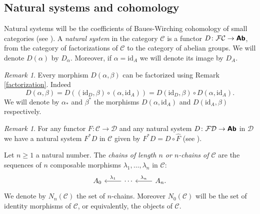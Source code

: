 \documentclass[12pt,reqno]{amsart}
\theoremstyle{definition}
\newtheorem{defi}[teo]{Definition}
\theoremstyle{remark}
\newtheorem{rem}[teo]{Remark}
\numberwithin{figure}{section}%
\newcommand{\CC}{\mathcal{C}}
\newcommand{\Dc}{\mathcal{D}}
\newcommand{\F}{\mathcal{F}}
\newcommand{\id}{\mathrm{id}}
\newcommand{\Ab}{\textbf{\textsf{Ab}}}
\begin{document}

\subsection{Natural systems and cohomology}\label{subsec:natural_systems_cohomology}
    Natural systems will be the coefficients of Baues-Wirching cohomology of small categories (see \cite{BAUES0}). A {\em natural system} in the category $\CC$ is a functor $D\colon \F \CC \rightarrow \Ab$, from the category of factorizations of $\CC$ to the category of abelian groups. We will denote $D(\alpha)$ by $D_\alpha$. Moreover, if $\alpha=\id_A$ we will denote its image by $D_A$.



\begin{rem}\label{alpha_y _beta*}
    Every morphism $D(\alpha, \beta)$ can be factorized using Remark \ref{factorization}. Indeed 
    $$D(\alpha, \beta)= D((\id_D, \beta) \circ (\alpha,\id_A) )= D(\id_D, \beta) \circ D(\alpha,\id_A).$$ 
    We will denote by $\alpha_*$ and $\beta^*$ the morphisms $D(\alpha,\id_A)$ and $D(\id_A,\beta)$ respectively. 
\end{rem}



\begin{rem}
For any functor $F\colon \CC \rightarrow \Dc$ and any natural system $D\colon  \F \Dc \rightarrow \Ab$ in $\Dc$ we have a natural system $F^*D$ in $\CC$ given by  $F^*D=D \circ \widehat{F}$ (see \cite{BAUES0}). 
\end{rem}


Let $n\geq 1$ a natural number. The {\em chains of length $n$ or $n$-chains of $\CC$} are the sequences of $n$ composable morphisms $\lambda_1, \dots,\lambda_n$ in $\CC$:
$$
\begin{tikzcd}
A_0 & \cdots \arrow[l, "\lambda_1"'] & A_{n} \arrow[l, "\lambda_{n}"'].
\end{tikzcd}$$
We denote by $N_n(\CC)$ the set of $n$-chains. Moreover $N_0(\CC)$ will be the set of identity morphisms of $\CC$, or equivalently, the objects of $\CC$. 
\end{document}
